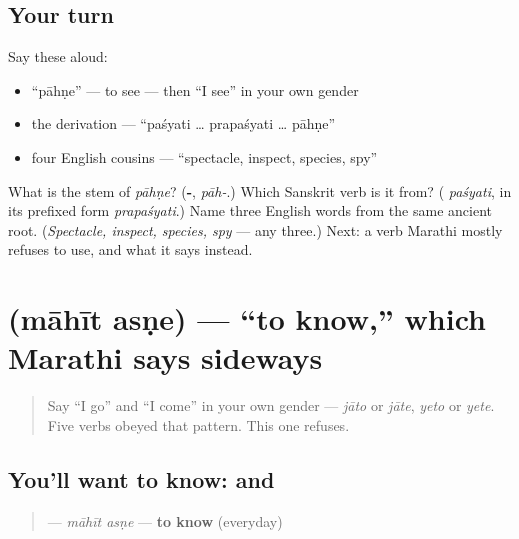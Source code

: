 \subsection*{Your turn}
Say these aloud:

\begin{itemize}
\raggedright
  \item \textquotedblleft{}pāhṇe\textquotedblright{} — to see — then \textquotedblleft{}I see\textquotedblright{} in your own gender
  \item the derivation — \textquotedblleft{}paśyati … prapaśyati … pāhṇe\textquotedblright{}
  \item four English cousins — \textquotedblleft{}spectacle, inspect, species, spy\textquotedblright{}
\end{itemize}

\begin{tcolorbox}[breakable,colback=teal!4,colframe=teal!35!black,title={Before you move on}]
What is the stem of \emph{pāhṇe}? (\textbf{-}, \emph{pāh-}.) Which Sanskrit verb is it from? (\textbf{} \emph{paśyati}, in its prefixed form \emph{prapaśyati}.) Name three English words from the same ancient root. (\emph{Spectacle, inspect, species, spy} — any three.) Next: a verb Marathi mostly refuses to use, and what it says instead.
\end{tcolorbox}
\section[māhīt asṇe]{  (māhīt asṇe) — \textquotedblleft{}to know,\textquotedblright{} which Marathi says sideways}

\label{lesson:MR-C07-mahit-asne}



\begin{quote}
Say \textquotedblleft{}I go\textquotedblright{} and \textquotedblleft{}I come\textquotedblright{} in your own gender — \emph{jāto} or \emph{jāte}, \emph{yeto} or \emph{yete}. Five verbs obeyed that pattern. This one refuses.
\end{quote}

\subsection*{You'll want to know:   and }
\begin{quote}
\textbf{ } — \emph{māhīt asṇe} — \textbf{to know} (everyday)
\end{quote}


